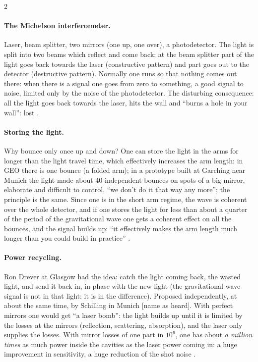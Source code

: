 \begin{paracol}{2}
\paragraph{The Michelson interferometer.} Laser, beam splitter, two mirrors (one up, one over), a photodetector. The light is split into two beams which reflect and come back; at the beam splitter part of the light goes back towards the laser (constructive pattern) and part goes out to the detector (destructive pattern). Normally one runs so that nothing comes out there: when there is a signal one goes from zero to something, a good signal to noise, limited only by the noise of the photodetector. The disturbing consequence: all the light goes back towards the laser, hits the wall and ``burns a hole in your wall'': lost .

\paragraph{Storing the light.} Why bounce only once up and down? One can store the light in the arms for longer than the light travel time, which effectively increases the arm length: in GEO there is one bounce (a folded arm); in a prototype built at Garching near Munich the light made about $40$ independent bounces on spots of a big mirror, elaborate and difficult to control, ``we don't do it that way any more''; the principle is the same. Since one is in the short arm regime, the wave is coherent over the whole detector, and if one stores the light for less than about a quarter of the period of the gravitational wave one gets a coherent effect on all the bounces, and the signal builds up: ``it effectively makes the arm length much longer than you could build in practice'' .

\paragraph{Power recycling.} Ron Drever at Glasgow had the idea: catch the light coming back, the wasted light, and send it back in, in phase with the new light (the gravitational wave signal is not in that light: it is in the difference). Proposed independently, at about the same time, by Schilling in Munich [name as heard]. With perfect mirrors one would get ``a laser bomb'': the light builds up until it is limited by the losses at the mirrors (reflection, scattering, absorption), and the laser only supplies the losses. With mirror losses of one part in $10^{6}$, one has about \emph{a million times} as much power inside the cavities as the laser power coming in: a huge improvement in sensitivity, a huge reduction of the shot noise .


\end{paracol}

